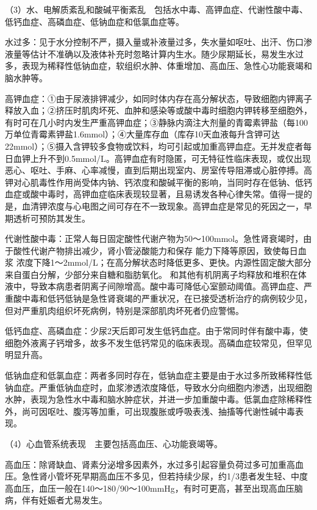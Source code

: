 （3）水、电解质紊乱和酸碱平衡紊乱　包括水中毒、高钾血症、代谢性酸中毒、低钙血症、高磷血症、低钠血症和低氯血症等。

水过多：见于水分控制不严，摄入量或补液量过多，失水量如呕吐、出汗、伤口渗液量等估计不准确以及液体补充时忽略计算内生水。随少尿期延长，易发生水过多，表现为稀释性低钠血症，软组织水肿、体重增加、高血压、急性心功能衰竭和脑水肿等。

高钾血症：①由于尿液排钾减少，如同时体内存在高分解状态，导致细胞内钾离子释放入血；②挤压时肌肉坏死、血肿和感染等或酸中毒时细胞内钾转移至细胞外，有时可在几小时内发生严重高钾血症；③静脉内滴注大剂量的青霉素钾盐（每100万单位青霉素钾盐1.6mmol）；④大量库存血（库存10天血液每升含钾可达22mmol）；⑤摄入含钾较多食物或饮料，均可引起或加重高钾血症。无并发症者每日血钾上升不到0.5mmol/L。高钾血症有时隐匿，可无特征性临床表现，或仅出现恶心、呕吐、手麻、心率减慢，直到后期出现室内、房室传导阻滞或心脏停搏。高钾对心肌毒性作用尚受体内钠、钙浓度和酸碱平衡的影响，当同时存在低钠、低钙血症或酸中毒时，高钾血症临床表现较显著，且易诱发各种心律失常。值得一提的是，血清钾浓度与心电图之间可存在不一致现象。高钾血症是常见的死因之一，早期透析可预防其发生。

代谢性酸中毒：正常人每日固定酸性代谢产物为50～100mmol。急性肾衰竭时，由于酸性代谢产物排出减少，肾小管泌酸能力和保存
能力下降等原因，致使每日血浆
浓度下降1～2mmol/L；在高分解状态时降低更多、更快。内源性固定酸大部分来自蛋白分解，少部分来自糖和脂肪氧化。
和其他有机阴离子均释放和堆积在体液中，导致本病患者阴离子间隙增高。酸中毒可降低心室颤动阈值。高钾血症、严重酸中毒和低钙低钠是急性肾衰竭的严重状况，在已接受透析治疗的病例较少见，但对严重肌肉组织坏死病例，特别是深部肌肉坏死者仍应警惕。

低钙血症、高磷血症：少尿2天后即可发生低钙血症。由于常同时伴有酸中毒，使细胞外液离子钙增多，故多不发生低钙常见的临床表现。高磷血症较常见，但罕见明显升高。

低钠血症和低氯血症：两者多同时存在，低钠血症主要是由于水过多所致稀释性低钠血症。严重低钠血症时，血浆渗透浓度降低，导致水分向细胞内渗透，出现细胞水肿，表现为急性水中毒和脑水肿症状，并进一步加重酸中毒。低氯血症除稀释性外，尚可因呕吐、腹泻等加重，可出现腹胀或呼吸表浅、抽搐等代谢性碱中毒表现。

（4）心血管系统表现　主要包括高血压、心功能衰竭等。

高血压：除肾缺血、肾素分泌增多因素外，水过多引起容量负荷过多可加重高血压。急性肾小管坏死早期高血压不多见，但若持续少尿，约1/3患者发生轻、中度高血压，血压一般在140～180/90～100mmHg，有时可更高，甚至出现高血压脑病，伴有妊娠者尤易发生。

